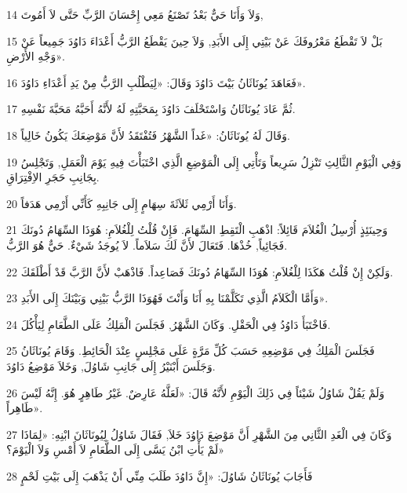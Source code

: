 \par 14 وَلاَ وَأَنَا حَيٌّ بَعْدُ تَصْنَعُ مَعِي إِحْسَانَ الرَّبِّ حَتَّى لاَ أَمُوتَ,
\par 15 بَلْ لاَ تَقْطَعُ مَعْرُوفَكَ عَنْ بَيْتِي إِلَى الأَبَدِ, وَلاَ حِينَ يَقْطَعُ الرَّبُّ أَعْدَاءَ دَاوُدَ جَمِيعاً عَنْ وَجْهِ الأَرْضِ».
\par 16 فَعَاهَدَ يُونَاثَانُ بَيْتَ دَاوُدَ وَقَالَ: «لِيَطْلُبِ الرَّبُّ مِنْ يَدِ أَعْدَاءِ دَاوُدَ».
\par 17 ثُمَّ عَادَ يُونَاثَانُ وَاسْتَحْلَفَ دَاوُدَ بِمَحَبَّتِهِ لَهُ لأَنَّهُ أَحَبَّهُ مَحَبَّةَ نَفْسِهِ.
\par 18 وَقَالَ لَهُ يُونَاثَانُ: «غَداً الشَّهْرُ فَتُفْتَقَدُ لأَنَّ مَوْضِعَكَ يَكُونُ خَالِياً.
\par 19 وَفِي الْيَوْمِ الثَّالِثِ تَنْزِلُ سَرِيعاً وَتَأْتِي إِلَى الْمَوْضِعِ الَّذِي اخْتَبَأْتَ فِيهِ يَوْمَ الْعَمَلِ, وَتَجْلِسُ بِجَانِبِ حَجَرِ الاِفْتِرَاقِ.
\par 20 وَأَنَا أَرْمِي ثَلاَثَةَ سِهَامٍ إِلَى جَانِبِهِ كَأَنِّي أَرْمِي هَدَفاً.
\par 21 وَحِينَئِذٍ أُرْسِلُ الْغُلاَمَ قَائِلاً: اذْهَبِ الْتَقِطِ السِّهَامَ. فَإِنْ قُلْتُ لِلْغُلاَمِ: هُوَذَا السِّهَامُ دُونَكَ فَجَائِياً, خُذْهَا. فَتَعَالَ لأَنَّ لَكَ سَلاَماً. لاَ يُوجَدُ شَيْءٌ. حَيٌّ هُوَ الرَّبُّ.
\par 22 وَلَكِنْ إِنْ قُلْتُ هَكَذَا لِلْغُلاَمِ: هُوَذَا السِّهَامُ دُونَكَ فَصَاعِداً. فَاذْهَبْ لأَنَّ الرَّبَّ قَدْ أَطْلَقَكَ.
\par 23 وَأَمَّا الْكَلاَمُ الَّذِي تَكَلَّمْنَا بِهِ أَنَا وَأَنْتَ فَهُوَذَا الرَّبُّ بَيْنِي وَبَيْنَكَ إِلَى الأَبَدِ».
\par 24 فَاخْتَبَأَ دَاوُدُ فِي الْحَقْلِ. وَكَانَ الشَّهْرُ, فَجَلَسَ الْمَلِكُ عَلَى الطَّعَامِ لِيَأْكُلَ.
\par 25 فَجَلَسَ الْمَلِكُ فِي مَوْضِعِهِ حَسَبَ كُلِّ مَرَّةٍ عَلَى مَجْلِسٍ عِنْدَ الْحَائِطِ. وَقَامَ يُونَاثَانُ وَجَلَسَ أَبْنَيْرُ إِلَى جَانِبِ شَاوُلَ, وَخَلاَ مَوْضِعُ دَاوُدَ.
\par 26 وَلَمْ يَقُلْ شَاوُلُ شَيْئاً فِي ذَلِكَ الْيَوْمِ لأَنَّهُ قَالَ: «لَعَلَّهُ عَارِضٌ. غَيْرُ طَاهِرٍ هُوَ. إِنَّهُ لَيْسَ طَاهِراً».
\par 27 وَكَانَ فِي الْغَدِ الثَّانِي مِنَ الشَّهْرِ أَنَّ مَوْضِعَ دَاوُدَ خَلاَ, فَقَالَ شَاوُلُ لِيُونَاثَانَ ابْنِهِ: «لِمَاذَا لَمْ يَأْتِ ابْنُ يَسَّى إِلَى الطَّعَامِ لاَ أَمْسِ وَلاَ الْيَوْمَ؟»
\par 28 فَأَجَابَ يُونَاثَانُ شَاوُلَ: «إِنَّ دَاوُدَ طَلَبَ مِنِّي أَنْ يَذْهَبَ إِلَى بَيْتِ لَحْمٍ
